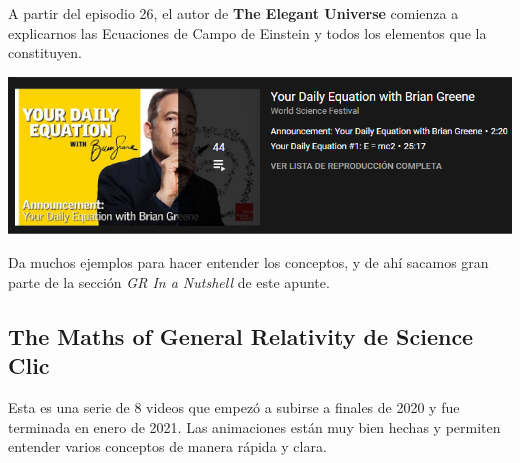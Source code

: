 A partir del episodio 26, el autor de \textbf{The Elegant Universe} comienza a explicarnos las Ecuaciones de Campo de Einstein y todos los elementos que la constituyen.
\begin{marginfigure}
\includegraphics[width=1.3\textwidth]{Im/bumpy.png}
\end{marginfigure}
Da muchos ejemplos para hacer entender los conceptos, y de ahí sacamos gran parte de la sección \textit{GR In a Nutshell} de este apunte.

\subsection*{\textbf{The Maths of General Relativity} de Science Clic}

Esta es una serie de 8 videos que empezó a subirse a finales de 2020 y fue terminada en enero de 2021. Las animaciones están muy bien hechas y permiten entender varios conceptos de manera rápida y clara. 

